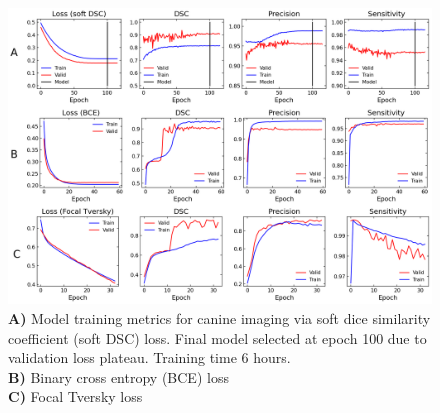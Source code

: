 

\begin{figure}[H]
	\begin{center}
		\hspace*{-1.2cm}\includegraphics[width=1.15\textwidth]{figures/vacbag_metrics_combined}
		\caption{\textbf{A)} Model training metrics for canine imaging via soft dice similarity coefficient (soft DSC) loss. Final model selected at epoch 100 due to validation loss plateau. Training time 6 hours.\\
		\textbf{B)} Binary cross entropy (BCE) loss\\
		\textbf{C)} Focal Tversky loss}
		\label{fig:vet_metrics}
	\end{center}
\end{figure}

